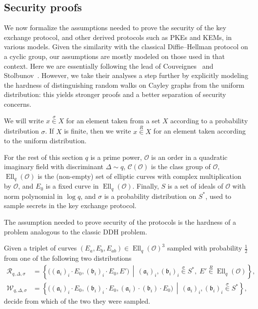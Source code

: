 \documentclass{llncs}
\newcommand{\Cl}{\mathcal{C}}
\renewcommand{\O}{\mathcal{O}}
\newcommand{\suchthat}{\,\middle\vert\,}
\renewcommand{\frak}{\mathfrak}
\newcommand{\rand}[1]{\overset{#1}{∈}}
\newcommand{\uni}{\rand{R}}
\DeclareMathOperator{\Ell}{Ell}
\begin{document}
\subsection{Security proofs}
\label{sec:proofs}

We now formalize the assumptions needed to prove the security of the
key exchange protocol, and other derived protocols such as PKEs and
KEMs, in various models. Given the similarity with the classical
Diffie--Hellman protocol on a cyclic group, our assumptions are
mostly modeled on those used in that context. Here we are
essentially following the lead of
Couveignes~\cite{cryptoeprint:2006:291} and
Stolbunov~\cite{Stol,Stolbunov2012}.
However, we take their analyses a
step further by explicitly modeling the hardness of distinguishing
random walks on Cayley graphs from the uniform distribution: this
yields stronger proofs and a better separation of security concerns.

We will write $x\rand{σ} X$ for an element taken from a set $X$
according to a probability distribution $σ$. If $X$ is finite,
then we write $x\uni X$ for an element taken according to the uniform
distribution.

For the rest of this section $q$ is a prime power, $\O$ is an order in
a quadratic imaginary field with discriminant $Δ\sim q$, $\Cl(\O)$ is
the class group of $\O$, $\Ell_q(\O)$ is the (non-empty) set of
elliptic curves with complex multiplication by $\O$, and $E_0$ is a
fixed curve in $\Ell_q(\O)$. Finally, $S$ is a set of ideals of $\O$
with norm polynomial in $\log q$, and $σ$ is a probability
distribution on $S^*$, used to sample secrets in the key exchange
protocol.

The assumption needed to prove security of the protocols is 
the hardness of a problem analogous to the classic DDH problem.

\begin{definition}
    Given a triplet of curves $(E_a,E_b,E_{ab})∈\Ell_q(\O)^3$ 
    sampled with probability $\frac{1}{2}$ 
    from one of the following two distributions
  \begin{align*}
    \mathcal{R}_{q,Δ,σ} &= \left\{\bigl((\frak a_i)_i·E_0,(\frak b_i)_i·E_0,E'\bigr) \suchthat
                        (\frak a_i)_i,(\frak b_i)_i\rand{σ}S^*,\;
                        E'\uni\Ell_q(\O)\right\},\\
    \mathcal{W}_{q,Δ,σ} &= \left\{\bigl((\frak a_i)_i·E_0,(\frak b_i)_i·E_0,(\frak a_i)·(\frak b_i)·E_0\bigr) \suchthat
                          (\frak a_i)_i,(\frak b_i)_i\rand{σ}S^*\right\},
  \end{align*}
  decide from which of the two they were sampled.
\end{definition}
\end{document}
